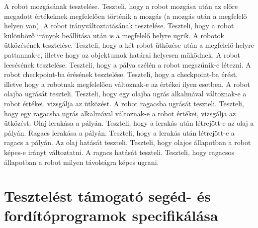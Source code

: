 	{A robot mozgásának tesztelése.}	{Teszteli, hogy a robot mozgása után az előre megadott értékeknek megfelelően történik a mozgás (a mozgás után a megfelelő helyen van).}
	{A robot irányváltoztatásának tesztelése.}	{Teszteli, hogy a robot különböző irányok beállítása után is a megfelelő helyre ugrik.}
	{A robotok ütközésének tesztelése.}	{Teszteli, hogy a két robot ütközése után a megfelelő helyre pattannak-e, illetve hogy az objektumok határai helyesen működnek.}
	{A robot leesésének tesztelése.}	{Teszteli, hogy a pálya szélén a robot megszűnik-e létezni.}
	{A robot checkpoint-ba érésének tesztelése.}	{Teszteli, hogy a checkpoint-ba érést, illetve hogy a robotnak megfelelően változnak-e az értékei ilyen esetben.}
	{A robot olajba ugrását teszteli.}	{Teszteli, hogy egy olajba ugrás alkalmával változnak-e a robot értékei, vizsgálja az ütközést.}
	{A robot ragacsba ugrását teszteli.}	{Teszteli, hogy egy ragacsba ugrás alkalmával változnak-e a robot értékei, vizsgálja az ütközést.}
	{Olaj lerakása a pályán.}	{Teszteli, hogy a lerakás után létrejött-e az olaj a pályán.}
	{Ragacs lerakása a pályán.}	{Teszteli, hogy a lerakás után létrejött-e a ragacs a pályán.}
	{Az olaj hatását teszteli.}	{Teszteli, hogy olajos állapotban a robot képes-e irányt változtatni.}
	{A ragacs hatását teszteli.}	{Teszteli, hogy ragacsos állapotban a robot milyen távolságra képes ugrani.}

\section{Tesztelést támogató segéd- és fordítóprogramok specifikálása}

